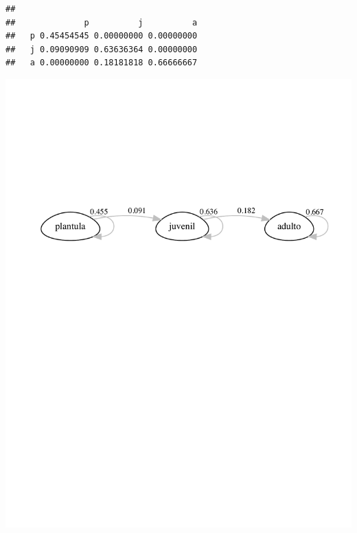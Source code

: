 \documentclass[
]{book}
\newenvironment{Shaded}{\begin{snugshade}}{\end{snugshade}}
\newcommand{\AttributeTok}[1]{\textcolor[rgb]{0.13,0.29,0.53}{#1}}
\newcommand{\FunctionTok}[1]{\textcolor[rgb]{0.13,0.29,0.53}{\textbf{#1}}}
\newcommand{\NormalTok}[1]{#1}
\newcommand{\OtherTok}[1]{\textcolor[rgb]{0.56,0.35,0.01}{#1}}
\newcommand{\SpecialCharTok}[1]{\textcolor[rgb]{0.81,0.36,0.00}{\textbf{#1}}}
\newcommand{\StringTok}[1]{\textcolor[rgb]{0.31,0.60,0.02}{#1}}
\theoremstyle{definition}
\theoremstyle{definition}
\theoremstyle{definition}
\theoremstyle{definition}
\theoremstyle{remark}
\begin{document}
\begin{verbatim}
##    
##              p          j          a
##   p 0.45454545 0.00000000 0.00000000
##   j 0.09090909 0.63636364 0.00000000
##   a 0.00000000 0.18181818 0.66666667
\end{verbatim}

\begin{Shaded}
\end{Shaded}

\includegraphics{Diagnostico_Poblacional_files/figure-latex/unnamed-chunk-62-1.pdf}
\end{document}
